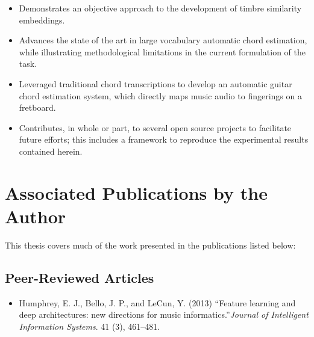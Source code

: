 \begin{itemize}
  \onehalfspacing
\item Demonstrates an objective approach to the development of timbre similarity embeddings.
\item Advances the state of the art in large vocabulary automatic chord estimation, while illustrating methodological limitations in the current formulation of the task.
\item Leveraged traditional chord transcriptions to develop an automatic guitar chord estimation system, which directly maps music audio to fingerings on a fretboard.
\item Contributes, in whole or part, to several open source projects to facilitate future efforts; this includes a framework to reproduce the experimental results contained herein.
\end{itemize}

\section{Associated Publications by the Author}

This thesis covers much of the work presented in the publications listed below:

\subsection{Peer-Reviewed Articles}
\renewcommand{\thefootnote}{\fnsymbol{footnote}}
\vspace{1em}
\begin{itemize}
\onehalfspacing
\item Humphrey, E. J., Bello, J. P., and LeCun, Y. (2013) ``Feature learning and deep architectures: new directions for music informatics.''{\it Journal of Intelligent Information Systems}. 41 (3), 461--481.

\end{itemize}

